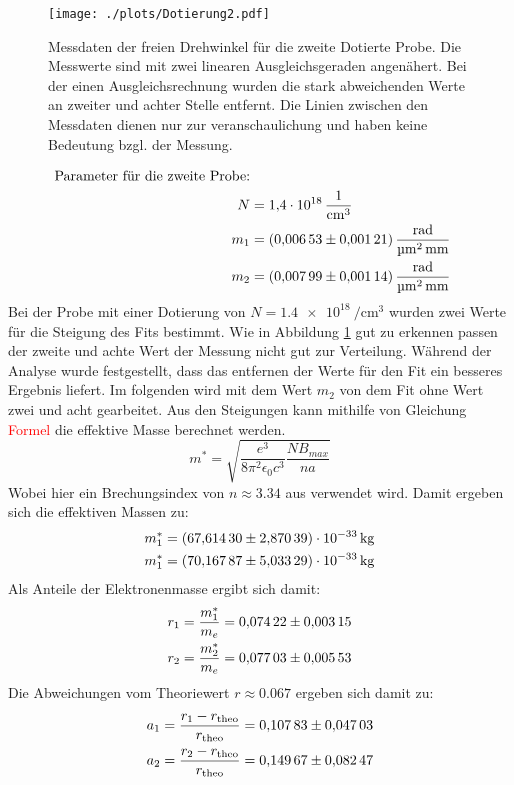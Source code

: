 \begin{figure}[ht]
    \centering
    \texttt{[image: ./plots/Dotierung2.pdf]}
    \caption{Messdaten der freien Drehwinkel für die zweite Dotierte Probe. Die Messwerte sind mit zwei linearen Ausgleichsgeraden angenähert. Bei der einen Ausgleichsrechnung wurden die stark abweichenden Werte an zweiter und achter Stelle entfernt. Die Linien zwischen den Messdaten dienen nur zur veranschaulichung und haben keine Bedeutung bzgl. der Messung.}
    \label{fig:dot2}
\end{figure}
\begin{align*}
    \text{Parameter für die zweite Probe:}\\
    N &= \SI{1.4e18}{\per \centi \metre \cubed}\\
    m_1 &= \SI{0.00653 +- 0.00121}{\radian \per \micro \metre \squared \per \milli \metre}\\
    m_2 &= \SI{0.00799 +- 0.00114}{\radian \per \micro \metre \squared \per \milli \metre}
\end{align*}
Bei der Probe mit einer Dotierung von $N = \SI[per-mode=reciprocal]{1.4e18}{\per \centi \metre \cubed}$ wurden zwei Werte für die Steigung des Fits bestimmt.
Wie in Abbildung \ref{fig:dot2} gut zu erkennen passen der zweite und achte Wert der Messung nicht gut zur Verteilung. 
Während der Analyse wurde festgestellt, dass das entfernen der Werte für den Fit ein besseres Ergebnis liefert.
Im folgenden wird mit dem Wert $m_2$ von dem Fit ohne Wert zwei und acht gearbeitet.
Aus den Steigungen kann mithilfe von Gleichung \textcolor{red}{Formel} die effektive Masse berechnet werden.
\begin{equation*}
    m^{*} = \sqrt{\frac{e^3}{8\pi^2 \epsilon_0 c^3} \frac{N B_{max}}{n a}}
\end{equation*}
Wobei hier ein Brechungsindex von $n ≈ \num{3,34}$ aus \cite{Dargys} verwendet wird.
Damit ergeben sich die effektiven Massen zu:
\begin{align*}
    m^{*}_1 &= \SI{67.61430 +- 2.87039e-33}{\kilo \gram}\\
    m^{*}_1 &= \SI{70.16787 +- 5.03329e-33}{\kilo \gram}
\end{align*}
Als Anteile der Elektronenmasse ergibt sich damit:
\begin{align*}
    r_1 &= \frac{m^{*}_1}{m_e} = \num{0.07422 +- 0.00315}\\
    r_2 &= \frac{m^{*}_2}{m_e} = \num{0.07703 +- 0.00553}
\end{align*}
Die Abweichungen vom Theoriewert $r ≈ 0.067$ \cite{doi:10.1063/1.324529} ergeben sich damit zu:
\begin{align*}
    a_1 &= \frac{r_1-r_{\text{theo}}}{r_{\text{theo}}} = \num{0.10783+-0.04703}\\
    a_2 &= \frac{r_2-r_{\text{theo}}}{r_{\text{theo}}} = \num{0.14967+-0.08247}
\end{align*}